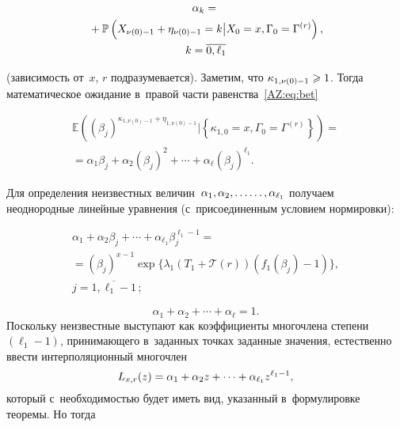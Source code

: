 \begin{multicols}{2}
\vspace*{-4pt}

\noindent
\begin{multline*}
\alpha_{k}={}\\
{}+\mathbb{P}\left(X_{\nu(0)-1}\hm+\eta_{\nu(0)-1}\hm=k\big\vert 
X_{0}\hm=x,\Gamma_{0}\hm=\Gamma^{(r)}\right),\\
 k=\overline{0, \ell_1}
\end{multline*}

\vspace*{-4pt}

\noindent
(зависимость от~$x$, $r$ подразумевается). Заметим, что
$\kappa_{1,\nu(0)-1}\hm\geqslant1$. Тогда математическое ожидание в~правой части
равенства~\eqref{AZ:eq:bet}

\vspace*{-4pt}

\noindent
\begin{multline*}
\!\mathbb{E}\left((\beta_{j})^{\kappa_{1,\nu(0)-1}+\eta_{1,\nu(0)-1}}
\Big\vert  \left\{\kappa_{1,0}=x,\Gamma_{0}=\Gamma^{(r)}\right\}\right)={}\\
{}=
\alpha_{1}\beta_{j}+\alpha_{2}(\beta_{j})^{2}+\cdots
+\alpha_{\ell}(\beta_{j})^{\ell_1}.
\end{multline*}

\vspace*{-4pt}

\noindent
Для определения неизвестных величин~$\alpha_1, \alpha_2, \ldots\linebreak
\ldots,
\alpha_{\ell_1}$ получаем неоднородные линейные уравнения (с~присоединенным
условием нормировки):

\columnbreak

\noindent
\begin{multline*}
  \alpha_{1}+\alpha_{2}\beta_{j}+\cdots+\alpha_{\ell_1}\beta_{j}^{\ell_1-1}={}\\
  {}=
  (\beta_{j})^{x-1}\exp\{\lambda_{1}(T_{1}+
  \mathcal T(r))(f_{1}(\beta_{j})-1)\},\\
   j=\overline{1,\ell_1-1}\,;
   \end{multline*}
   
   \vspace*{-9pt}
   
   \noindent
   $$
\alpha_{1}+\alpha_{2}+\cdots+\alpha_{\ell}=1.
$$
Поскольку неизвестные выступают как коэффициенты многочлена степени
$(\ell_1-1)$, принимающего в~заданных точках заданные значения, естественно
ввести интерполяционный многочлен
$$
L_{x,r}(z)=\alpha_1\hm+\alpha_2 z+\cdots+ \alpha_{\ell_1} z^{\ell_1-1},
$$
 который 
с~необходимостью будет иметь вид, указанный в~формулировке теоремы. Но тогда


\end{multicols}
